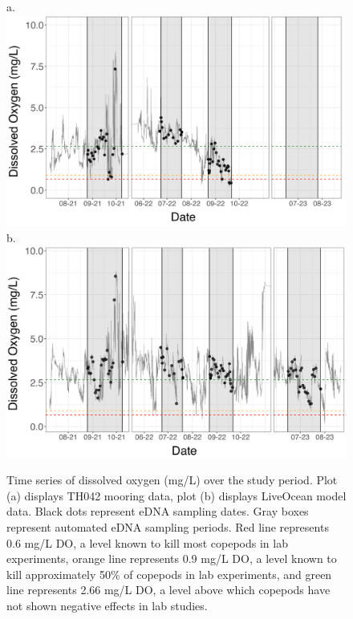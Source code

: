 \documentclass[12pt,twoside]{reedthesis}
\begin{document}
	\begin{figure}[!h]
		\begin{center}
			a. \includegraphics[scale=0.6]{Timeseries_example} \\
			b. \includegraphics[scale=0.6]{Timeseries_example_Mod}
			\caption[Time series]{Time series of dissolved oxygen (mg/L) over the study period. Plot (a) displays TH042 mooring data, plot (b) displays LiveOcean model data. Black dots represent eDNA sampling dates. Gray boxes represent automated eDNA sampling periods. Red line represents 0.6 mg/L DO, a level known to kill most copepods in lab experiments, orange line represents 0.9 mg/L DO, a level known to kill approximately 50\% of copepods in lab experiments, and green line represents 2.66 mg/L DO, a level above which copepods have not shown negative effects in lab studies.} \label{Timeseries}%
		\end{center}
		
	\end{figure} 
	
\end{document}
